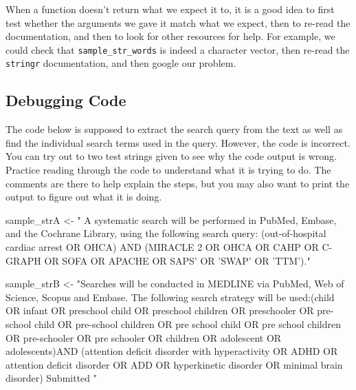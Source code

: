\documentclass[
  letterpaper,
]{krantz}
\makeatletter
\newenvironment{Shaded}{\begin{snugshade}}{\end{snugshade}}
\newcommand{\NormalTok}[1]{\textcolor[rgb]{0.00,0.23,0.31}{#1}}
\newcommand{\OtherTok}[1]{\textcolor[rgb]{0.00,0.23,0.31}{#1}}
\newcommand{\StringTok}[1]{\textcolor[rgb]{0.13,0.47,0.30}{#1}}
\newenvironment{kframe}{%
\medskip{}
\setlength{\fboxsep}{.8em}
 \def\at@end@of@kframe{}%
 \ifinner\ifhmode%
  \def\at@end@of@kframe{\end{minipage}}%
  \begin{minipage}{\columnwidth}%
 \fi\fi%
 \def\FrameCommand##1{\hskip\@totalleftmargin \hskip-\fboxsep
 \colorbox{shadecolor}{##1}\hskip-\fboxsep
     \hskip-\linewidth \hskip-\@totalleftmargin \hskip\columnwidth}%
 \MakeFramed {\advance\hsize-\width
   \@totalleftmargin\z@ \linewidth\hsize
   \@setminipage}}%
 {\par\unskip\endMakeFramed%
 \at@end@of@kframe}
\renewenvironment{Shaded}{\begin{kframe}}{\end{kframe}}
\makeatother
\begin{document}
When a function doesn't return what we expect it to, it is a good idea
to first test whether the arguments we gave it match what we expect,
then to re-read the documentation, and then to look for other resources
for help. For example, we could check that \texttt{sample\_str\_words}
is indeed a character vector, then re-read the \texttt{stringr}
documentation, and then google our problem.

\hypertarget{debugging-code}{%
\subsection{Debugging Code}\label{debugging-code}}

The code below is supposed to extract the search query from the text as
well as find the individual search terms used in the query. However, the
code is incorrect. You can try out to two test strings given to see why
the code output is wrong. Practice reading through the code to
understand what it is trying to do. The comments are there to help
explain the steps, but you may also want to print the output to figure
out what it is doing.

\begin{Shaded}
\begin{Highlighting}[]
\NormalTok{sample\_strA }\OtherTok{\textless{}{-}} \StringTok{" A systematic search will be performed in PubMed, Embase, and }
\StringTok{the Cochrane Library, using the following search query:   (\textquotesingle{}out{-}of{-}hospital }
\StringTok{cardiac arrest\textquotesingle{} OR \textquotesingle{}OHCA\textquotesingle{}) AND (\textquotesingle{}MIRACLE 2\textquotesingle{} OR \textquotesingle{}OHCA\textquotesingle{} OR \textquotesingle{}CAHP\textquotesingle{} OR \textquotesingle{}C{-}GRAPH\textquotesingle{} }
\StringTok{OR \textquotesingle{}SOFA\textquotesingle{} OR \textquotesingle{}APACHE\textquotesingle{} OR \textquotesingle{}SAPS’ OR ’SWAP’ OR ’TTM’)."}

\NormalTok{sample\_strB }\OtherTok{\textless{}{-}} \StringTok{"Searches will be conducted in MEDLINE via PubMed, Web of }
\StringTok{Science, Scopus and Embase. The following search strategy will be used:(child }
\StringTok{OR infant OR preschool child OR preschool children OR preschooler OR pre{-}school }
\StringTok{child OR pre{-}school children OR pre school child OR pre school children OR }
\StringTok{pre{-}schooler OR pre schooler OR children OR adolescent OR adolescents)AND}
\StringTok{(attention deficit disorder with hyperactivity OR ADHD OR attention deficit}
\StringTok{disorder OR ADD OR hyperkinetic disorder OR minimal brain disorder) Submitted "}
\end{Highlighting}
\end{Shaded}
\end{document}
